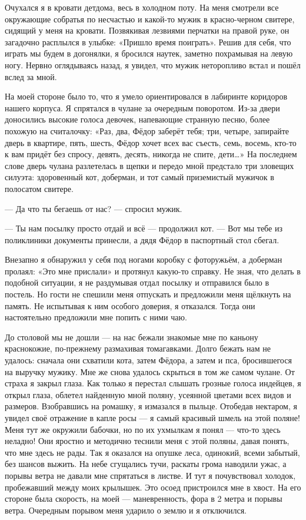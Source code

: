 Очухался я в кровати детдома, весь в холодном поту. На меня смотрели все окружающие собратья по несчастью и какой-то мужик в красно-черном свитере, сидящий у меня на кровати. Позвякивая лезвиями перчатки на правой руке, он загадочно расплылся в улыбке: «Пришло время поиграть». Решив для себя, что играть мы будем в догонялки, я бросился наутек, заметно похрамывая на левую ногу. Нервно оглядываясь назад, я увидел, что мужик неторопливо встал и пошёл вслед за мной.


На моей стороне было то, что я умело ориентировался в лабиринте коридоров нашего корпуса. Я спрятался в чулане за очередным поворотом. Из-за двери доносились высокие голоса девочек, напевающие странную песню, более похожую на считалочку: «Раз, два, Фёдор заберёт тебя; три, четыре, запирайте дверь в квартире, пять, шесть, Фёдор хочет всех вас съесть, семь, восемь, кто-то к вам придёт без спросу, девять, десять, никогда не спите, дети…» На последнем слове дверь чулана разлетелась в щепки и передо мной предстало три зловещих силуэта: здоровенный кот, доберман, и тот самый приземистый мужичок в полосатом свитере.



--- Да что ты бегаешь от нас? --- спросил мужик.

--- Ты нам посылку просто отдай и всё --- продолжил кот. --- Вот мы тебе из поликлиники документы принесли, а дядя Фёдор в паспортный стол сбегал.


Внезапно я обнаружил у себя под ногами коробку с фоторужьём, а доберман пролаял: «Это мне прислали» и протянул какую-то справку. Не зная, что делать в подобной ситуации, я не раздумывая отдал посылку и отправился было в постель. Но гости не спешили меня отпускать и предложили меня щёлкнуть на память. Не испытывая к ним особого доверия, я отказался. Тогда они настоятельно предложили мне попить с ними чаю.


До столовой мы не дошли --- на нас бежали знакомые мне по каньону краснокожие, по-прежнему размахивая томагавками. Долго бежать нам не удалось: сначала они схватили кота, затем Фёдора, а затем и пса, бросившегося на выручку мужику. Мне же снова удалось скрыться в том же самом чулане. От страха я закрыл глаза. Как только я перестал слышать грозные голоса индейцев, я открыл глаза, облетел найденную мной поляну, усеянной цветами всех видов и размеров. Взобравшись на ромашку, я измазался в пыльце. Отобедав нектаром, я увидел своё отражение в капле росы --- я самый красивый шмель на этой поляне! Меня тут же окружили бабочки, но по их ухмылкам я понял --- что-то здесь неладно! Они яростно и методично теснили меня с этой поляны, давая понять, что мне здесь не рады. Так я оказался на опушке леса, одинокий, всеми забытый, без шансов выжить. На небе сгущались тучи, раскаты грома наводили ужас, а порывы ветра не давали мне спрятаться в листве. И тут я почувствовал холодок, пробежавший между моих крылышек. Это осоед пристроился мне в хвост. На его стороне была скорость, на моей --- маневренность, фора в 2 метра и порывы ветра. Очередным порывом меня ударило о землю и я отключился.


